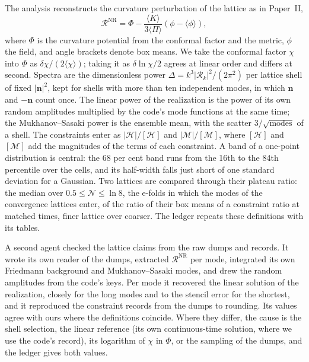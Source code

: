 \documentclass[aps,prd,twocolumn,10pt,superscriptaddress,nofootinbib,longbibliography,floatfix]{revtex4-2}
\newcommand{\Ham}{\mathcal{H}}
\newcommand{\Mom}{\mathcal{M}}
\newcommand{\Ptwo}{Paper~II}
\begin{document}
The analysis reconstructs the curvature perturbation of the lattice as in \Ptwo{},
\begin{equation}
\mathcal{R}^\mathrm{NR} = \Phi - \frac{\langle K\rangle}{3\langle \Pi\rangle}\left(\phi - \langle\phi\rangle\right),
\label{eq:rnr}
\end{equation}
where $\Phi$ is the curvature potential from the conformal factor and the metric, $\phi$ the field, and angle brackets denote box means. We take the conformal factor $\chi$ into $\Phi$ as $\delta\chi/(2\langle\chi\rangle)$; taking it as $\delta\ln\chi/2$ agrees at linear order and differs at second. Spectra are the dimensionless power $\Delta = k^3|\mathcal{R}_k|^2/(2\pi^2)$ per lattice shell of fixed $|\bm n|^2$, kept for shells with more than ten independent modes, in which $\bm n$ and $-\bm n$ count once. The linear power of the realization is the power of its own random amplitudes multiplied by the code's mode functions at the same time; the Mukhanov--Sasaki power is the ensemble mean, with the scatter $3/\sqrt{\text{modes}}$ of a shell. The constraints enter as $|\Ham|/[\Ham]$ and $|\Mom|/[\Mom]$, where $[\Ham]$ and $[\Mom]$ add the magnitudes of the terms of each constraint. A band of a one-point distribution is central: the 68 per cent band runs from the 16th to the 84th percentile over the cells, and its half-width falls just short of one standard deviation for a Gaussian. Two lattices are compared through their plateau ratio: the median over $0.5 \le \mathcal{N} \le \ln 8$, the e-folds in which the modes of the convergence lattices enter, of the ratio of their box means of a constraint ratio at matched times, finer lattice over coarser. The ledger repeats these definitions with its tables.

A second agent checked the lattice claims from the raw dumps and records. It wrote its own reader of the dumps, extracted $\mathcal{R}^\mathrm{NR}$ per mode, integrated its own Friedmann background and Mukhanov--Sasaki modes, and drew the random amplitudes from the code's keys. Per mode it recovered the linear solution of the realization, closely for the long modes and to the stencil error for the shortest, and it reproduced the constraint records from the dumps to rounding. Its values agree with ours where the definitions coincide. Where they differ, the cause is the shell selection, the linear reference (its own continuous-time solution, where we use the code's record), its logarithm of $\chi$ in $\Phi$, or the sampling of the dumps, and the ledger gives both values.
\end{document}
